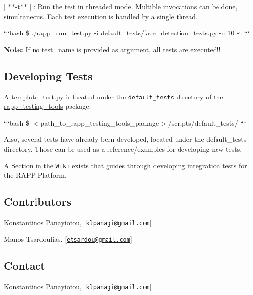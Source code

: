 \begin{DoxyItemize}
\item \mbox{[} $\ast$$\ast$-\/t$\ast$$\ast$ \mbox{]} \-: Run the test in threaded mode. Multible invocations can be done, simultaneous. Each test execution is handled by a single thread.
\end{DoxyItemize}

```bash \$ ./rapp\-\_\-run\-\_\-test.py -\/i \hyperlink{face__detection__tests_8py}{default\-\_\-tests/face\-\_\-detection\-\_\-tests.\-py} -\/n 10 -\/t ```

{\bfseries Note\-:} If no test\-\_\-name is provided as argument, all tests are executed!!

\subsection*{Developing Tests}

A \hyperlink{template__test_8py}{template\-\_\-test.\-py} is located under the \href{https://github.com/rapp-project/rapp-platform/tree/master/rapp_testing_tools/scripts/default_tests}{\tt default\-\_\-tests} directory of the \hyperlink{namespacerapp__testing__tools}{rapp\-\_\-testing\-\_\-tools} package.

```bash \$ $<$path\-\_\-to\-\_\-rapp\-\_\-testing\-\_\-tools\-\_\-package$>$/scripts/default\-\_\-tests/ ```

Also, several tests have already been developed, located under the default\-\_\-tests directory. Those can be used as a reference/examples for developing new tests.

A Section in the \href{https://github.com/rapp-project/rapp-platform/wiki/How-to-implement-an-integration-test%3F}{\tt Wiki} exists that guides through developing integration tests for the R\-A\-P\-P Platform.

\subsection*{Contributors}


\begin{DoxyItemize}
\item Konstantinos Panayiotou, \mbox{[}\href{mailto:klpanagi@gmail.com}{\tt klpanagi@gmail.\-com}\mbox{]}
\item Manos Tsardoulias. \mbox{[}\href{mailto:etsardou@gmail.com}{\tt etsardou@gmail.\-com}\mbox{]}
\end{DoxyItemize}

\subsection*{Contact}


\begin{DoxyItemize}
\item Konstantinos Panayiotou, \mbox{[}\href{mailto:klpanagi@gmail.com}{\tt klpanagi@gmail.\-com}\mbox{]} 
\end{DoxyItemize}